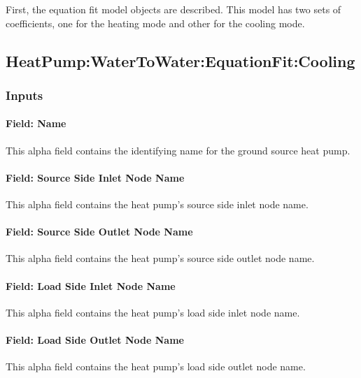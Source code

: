 First, the equation fit model objects are described. This model has two sets of coefficients, one for the heating mode and other for the cooling mode.

\subsection{HeatPump:WaterToWater:EquationFit:Cooling}\label{heatpumpwatertowaterequationfitcooling}

\subsubsection{Inputs}\label{inputs-12-012}

\paragraph{Field: Name}\label{field-name-11-010}

This alpha field contains the identifying name for the ground source heat pump.

\paragraph{Field: Source Side Inlet Node Name}\label{field-source-side-inlet-node-name}

This alpha field contains the heat pump's source side inlet node name.

\paragraph{Field: Source Side Outlet Node Name}\label{field-source-side-outlet-node-name}

This alpha field contains the heat pump's source side outlet node name.

\paragraph{Field: Load Side Inlet Node Name}\label{field-load-side-inlet-node-name}

This alpha field contains the heat pump's load side inlet node name.

\paragraph{Field: Load Side Outlet Node Name}\label{field-load-side-outlet-node-name}

This alpha field contains the heat pump's load side outlet node name.

